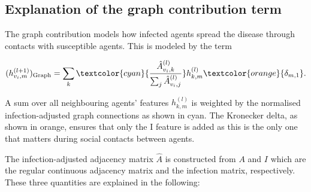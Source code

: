 \subsection{Explanation of the graph contribution term}

The graph contribution models how infected agents spread the disease through contacts with susceptible agents. This is modeled by the term

\begin{equation}
	(h_{v_i, m}^{(l+1)})_{\text{Graph}} = \sum_k \textcolor{cyan}{\frac{\hat{A}_{v_i, k}^{(l)}}{\sum_j \hat{A}_{v_i, j}^{(l)}}} h_{k, m}^{(l)} \textcolor{orange}{\delta_{m, 1}}.
\end{equation}

A sum over all neighbouring agents' features $h_{k,m}^{(l)}$ is weighted by the normalised infection-adjusted graph connections as shown in cyan. The Kronecker delta, as shown in orange, ensures that only the I feature is added as this is the only one that matters during social contacts between agents.

The infection-adjusted adjacency matrix $\hat{A}$ is constructed from $A$ and $I$ which are the regular continuous adjacency matrix and the infection matrix, respectively. These three quantities are explained in the following:
	
